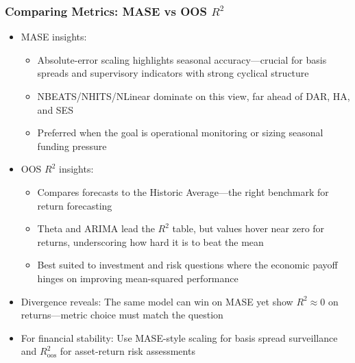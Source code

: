 \documentclass[ignorenonframetext, 9pt]{beamer}
\begin{document}
\begin{frame}
  \frametitle{Comparing Metrics: MASE vs OOS $R^2$}
  \begin{itemize}
  \item \alert{MASE insights:}
  \begin{itemize}
    \item Absolute-error scaling highlights seasonal accuracy—crucial for basis spreads and supervisory indicators with strong cyclical structure
    \item NBEATS/NHITS/NLinear dominate on this view, far ahead of DAR, HA, and SES
    \item Preferred when the goal is operational monitoring or sizing seasonal funding pressure
  \end{itemize}
  \vspace{0.3cm}
  \item \alert{OOS $R^2$ insights:}
  \begin{itemize}
    \item Compares forecasts to the Historic Average—the right benchmark for return forecasting
    \item Theta and ARIMA lead the $R^2$ table, but values hover near zero for returns, underscoring how hard it is to beat the mean
    \item Best suited to investment and risk questions where the economic payoff hinges on improving mean-squared performance
  \end{itemize}
  \vspace{0.3cm}
  \item \alert{Divergence reveals:} The same model can win on MASE yet show $R^2 \approx 0$ on returns—metric choice must match the question
  \vspace{0.3cm}
  \item \alert{For financial stability:} Use MASE-style scaling for basis spread surveillance and $R^2_{\text{oos}}$ for asset-return risk assessments
  \end{itemize}
\end{frame}
\end{document}
